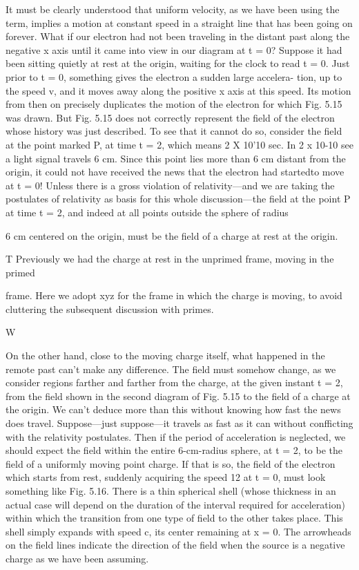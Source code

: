 It must be clearly understood that uniform velocity, as we have
been using the term, implies a motion at constant speed in a straight
line that has been going on forever. What if our electron had not
been traveling in the distant past along the negative x axis until it
came into view in our diagram at t = 0? Suppose it had been sitting
quietly at rest at the origin, waiting for the clock to read t = 0. Just
prior to t = 0, something gives the electron a sudden large accelera-
tion, up to the speed v, and it moves away along the positive x axis
at this speed. Its motion from then on precisely duplicates the motion
of the electron for which Fig. 5.15 was drawn. But Fig. 5.15
does not correctly represent the field of the electron whose history
was just described. To see that it cannot do so, consider the field at
the point marked P, at time t = 2, which means 2 X 10'10 sec. In
2 x 10-10 see a light signal travels 6 cm. Since this point lies more
than 6 cm distant from the origin, it could not have received the news
that the electron had startedto move at t = 0! Unless there is a
gross violation of relativity---and we are taking the postulates of
relativity as basis for this whole discussion---the field at the point P
at time t = 2, and indeed at all points outside the sphere of radius

6 cm centered on the origin, must be the field of a charge at rest at the
origin.

T Previously we had the charge at rest in the unprimed frame, moving in the primed

frame. Here we adopt xyz for the frame in which the charge is moving, to avoid cluttering
the subsequent discussion with primes.

 

W

On the other hand, close to the moving charge itself, what happened
in the remote past can't make any difference. The field must
somehow change, as we consider regions farther and farther from
the charge, at the given instant t = 2, from the field shown in the
second diagram of Fig. 5.15 to the field of a charge at the origin. We
can't deduce more than this without knowing how fast the news does
travel. Suppose---just suppose---it travels as fast as it can without
confficting with the relativity postulates. Then if the period of acceleration
is neglected, we should expect the field within the entire
6-cm-radius sphere, at t = 2, to be the field of a uniformly moving
point charge. If that is so, the field of the electron which starts from
rest, suddenly acquiring the speed 12 at t = 0, must look something
like Fig. 5.16. There is a thin spherical shell (whose thickness in an
actual case will depend on the duration of the interval required for
acceleration) within which the transition from one type of field to
the other takes place. This shell simply expands with speed c, its
center remaining at x = 0. The arrowheads on the field lines indicate
the direction of the field when the source is a negative charge
as we have been assuming.

